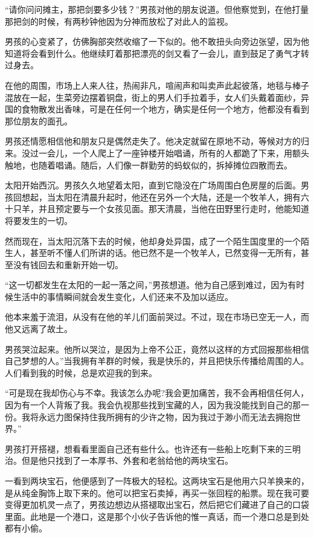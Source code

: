 \documentclass[twoside,openany]{book}
\begin{document}
“请你问问摊主，那把剑要多少钱？”男孩对他的朋友说道。但他察觉到，在他打量那把剑的时候，有两秒钟他因为分神而放松了对此人的监视。

男孩的心变紧了，仿佛胸部突然收缩了一下似的。他不敢扭头向旁边张望，因为他知道将会看到什么。他继续盯着那把漂亮的剑又看了一会儿，直到鼓足了勇气才转过身去。

在他的周围，市场上人来人往，热闹非凡，喧闹声和叫卖声此起彼落，地毯与棒子混放在一起，生菜旁边摆着铜盘，街上的男人们手拉着手，女人们头戴着面纱，异国的食物散发出香味，可是在任何一个地方，确实是任何一个地方，他都没有看到那位朋友的面孔。

男孩还情愿相信他和朋友只是偶然走失了。他决定就留在原地不动，等候对方的归来。没过一会儿，一个人爬上了一座钟楼开始唱诵，所有的人都跪了下来，用额头触地，也随着唱诵。随后，人们像一群勤劳的蚂蚁似的，拆掉摊位四散而去。

太阳开始西沉。男孩久久地望着太阳，直到它隐没在广场周围白色房屋的后面。男孩回想起，当太阳在清晨升起时，他还在另外一个大陆，还是一个牧羊人，拥有六十只羊，并且预定要与一个女孩见面。那天清晨，当他在田野里行走时，他能知道将要发生的一切。

然而现在，当太阳沉落下去的时候，他却身处异国，成了一个陌生国度里的一个陌生人，甚至听不懂人们所讲的话。他已然不是一个牧羊人，已然变得一无所有，甚至没有钱回去和重新开始一切。

“这一切都发生在太阳的一起一落之间，”男孩想道。他为自己感到难过，因为有时候生活中的事情瞬间就会发生变化，人们还来不及加以适应。

他本来羞于流泪，从没有在他的羊儿们面前哭过。不过，现在市场已空无一人，而他又远离了故土。

男孩哭泣起来。他所以哭泣，是因为上帝不公正，竟然以这样的方式回报那些相信自己梦想的人。”当我拥有羊群的时候，我是快乐的，并且把快乐传播给周围的人。人们看到我的时候，总是欢迎我的到来。

“可是现在我却伤心与不幸。我该怎么办呢?我会更加痛苦，我不会再相信任何人，因为有一个人背叛了我。我会仇视那些找到宝藏的人，因为我没能找到自己的那一份。我将永远力图保持住我所拥有的少许之物，因为我过于渺小而无法去拥抱世界。”

男孩打开搭褪，想看看里面自己还有些什么。也许还有一些船上吃剩下来的三明治。但是他只找到了一本厚书、外套和老翁给他的两块宝石。

一看到两块宝石，他便感到了一阵极大的轻松。这两块宝石是他用六只羊换来的，是从纯金胸饰上取下来的。他可以把宝石卖掉，再买一张回程的船票。现在我可要变得更加机灵一点了，男孩边想边从搭褪取出宝石，然后把它们藏进了自己的口袋里面。此地是一个港口，这是那个小伙子告诉他的惟一真话，而一个港口总是到处都有小偷。
\end{document}
